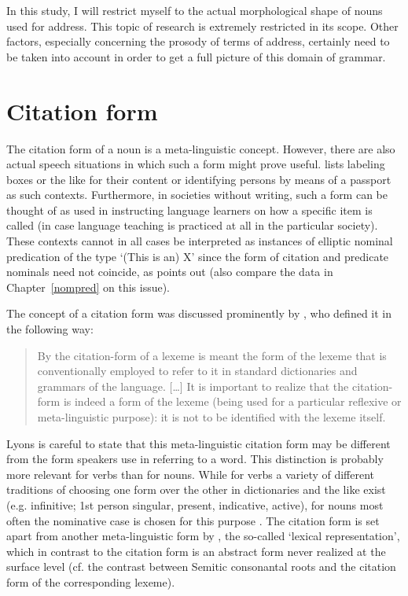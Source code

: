 In this study, I will restrict myself to the actual morphological shape of nouns used for address. 
This topic of research is extremely restricted in its scope. 
Other factors, especially concerning the prosody of terms of address, certainly need to be taken into account in order to get a full picture of this domain of grammar.


\section{Citation form}\label{Citation}

The citation form of a noun is a meta-linguistic concept.
However, there are also actual speech situations in which such a form might prove useful. 
\citet[450]{Creissels:2009} lists labeling boxes or the like for their content or identifying persons by means of a passport as such contexts.
Furthermore, in societies without writing, such a form can be thought of as used in instructing language learners on how a specific item is called (in case language teaching is practiced at all in the particular society). 
These contexts cannot in all cases be interpreted as instances of elliptic nominal predication of the type `(This is an) X' since the form of citation and predicate nominals need not coincide, as \citet[450]{Creissels:2009} points out (also compare the data in Chapter~\ref{nompred} on this issue).
 
The concept of a citation form was discussed prominently by \citeauthor{Lyons:1977}, who defined it in the following way: 
\begin{quote}
By the citation-form of a lexeme is meant the form of the lexeme that is conventionally employed to refer to it in standard dictionaries and grammars of the language. [\dots] It is important to realize that the citation-form is indeed a form of the lexeme (being used for a particular reflexive or meta-linguistic purpose): it is not to be identified with the lexeme itself. \citep[19]{Lyons:1977}
\end{quote}

Lyons is careful to state that this meta-linguistic citation form may be different from the form speakers use in referring to a word. 
This distinction is probably more relevant for verbs than for nouns.
While for verbs a variety of different traditions of choosing one form over the other in dictionaries and the like exist (e.g. infinitive; 1st person singular, present, indicative, active), for nouns most often the nominative  case is chosen for this purpose \citep[40]{Aronoff:1994}.
The citation form is set apart from another meta-linguistic form by \citet[41]{Aronoff:1994}, the so-called `lexical representation', which in contrast to the citation form is an abstract form never realized at the surface level (cf. the contrast between Semitic consonantal roots and the citation form of the corresponding lexeme).

